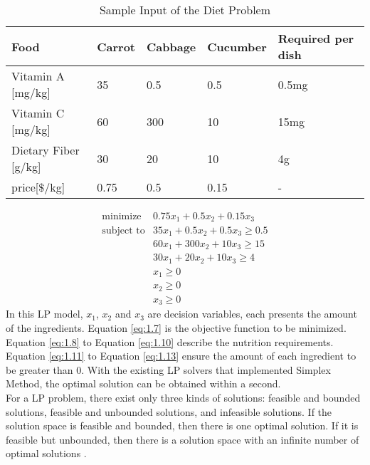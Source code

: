 \begin{table} 
\begin{center}
\begin{tabular}{| l | l  l  l | l |}
\hline
Food & Carrot & Cabbage & Cucumber & Required per dish \\ \hline
Vitamin A [mg/kg] & 35 & 0.5 & 0.5 & 0.5mg \\ 
Vitamin C [mg/kg] & 60 & 300 & 10 & 15mg \\ 
Dietary Fiber [g/kg] & 30 & 20 & 10 & 4g \\ \hline
price[$\$$/kg] & 0.75 & 0.5 & 0.15 & - \\ \hline
\end{tabular} 
\end{center}
\caption{Sample Input of the Diet Problem}
\label{tab:1.1}
\end{table}	

\begin{eqnarray} 
\text{minimize} & 0.75x_{1} + 0.5x_{2} +  0.15x_{3}  \label{eq:1.7} \\
\text{subject to} & 35x_{1} + 0.5x_{2} + 0.5x_{3} \geq 0.5 \label{eq:1.8} \\
& 60x_{1} + 300x_{2} + 10x_{3} \geq 15 \label{eq:1.9} \\
& 30x_{1} + 20x_{2} + 10x_{3} \geq 4 \label{eq:1.10} \\
& x_{1} \geq 0  \label{eq:1.11} \\
& x_{2} \geq 0  \label{eq:1.12} \\
& x_{3} \geq 0  \label{eq:1.13}
\end{eqnarray} 
In this LP model, $x_{1}$, $x_{2}$ and $x_{3}$ are decision variables, each presents the amount of the ingredients. Equation \ref{eq:1.7} is the objective function to be minimized. Equation \ref{eq:1.8} to Equation \ref{eq:1.10} describe the nutrition requirements. Equation \ref{eq:1.11} to Equation \ref{eq:1.13} ensure the amount of each ingredient to be greater than 0. With the existing LP solvers that implemented Simplex Method, the optimal solution can be obtained within a second. \\

For a LP problem, there exist only three kinds of solutions: feasible and bounded solutions, feasible and unbounded solutions, and infeasible solutions. If the solution space is feasible and bounded, then there is one optimal solution. If it is feasible but unbounded, then there is a solution space with an infinite number of optimal solutions \cite{LP}. \\

